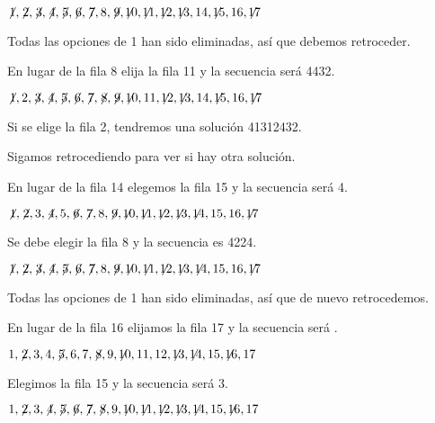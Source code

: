 $\not\! 1,\not\! 2,\not\! 3,\not\! 4,\not\! 5,\not\! 6,\not\! 7,8,\not\! 9,\not\!\! 10,\not\!\! 11,\not\!\! 12,\not\!\! 13,14, \not\!\! 15,16,\not\!\! 17$

\noindent Todas las opciones de 1 han sido eliminadas, así que debemos retroceder.

\smallskip

\noindent En lugar de la fila 8 elija la fila 11 y la secuencia será 44{}3{}2.


$\not\! 1,2,\not\! 3,\not\! 4,\not\! 5,\not\! 6,\not\! 7,\not\! 8,\not\! 9,\not\!\! 10,11,\not\!\! 12,\not\!\! 13,14, \not\!\! 15,16,\not\!\! 17$

\noindent  Si se elige la fila 2, tendremos una solución 4{}1{}3{}1{}2{}4{}3{}2.

\smallskip

\noindent Sigamos retrocediendo para ver si hay otra solución.

\smallskip

\noindent En lugar de la fila 14 elegemos la fila 15 y la secuencia será 4\textvisiblespace {}.

$\not\! 1,\not\! 2,3,\not\! 4,5,\not\! 6,\not\! 7,8,\not\! 9,\not\!\! 10,\not\!\! 11,\not\!\! 12,\not\!\! 13,\not\!\! 14,15,16,\not\!\! 17$

\noindent Se debe elegir la fila 8 y la secuencia es 4{}22{}4.

$\not\! 1,\not\! 2,\not\! 3,\not\! 4,\not\! 5,\not\! 6,\not\! 7,8,\not\! 9,\not\!\! 10,\not\!\! 11,\not\!\! 12,\not\!\! 13,\not\!\! 14,15,16,\not\!\! 17$

\noindent Todas las opciones de 1 han sido eliminadas, así que de nuevo retrocedemos.

\smallskip

\noindent En lugar de la fila 16 elijamos la fila 17 y la secuencia será \textvisiblespace \textvisiblespace \textvisiblespace{}\textvisiblespace.

$1,\not\! 2,3,4,\not\! 5,6,7,\not\! 8,9,\not\!\! 10,11,12,\not\!\! 13,\not\!\! 14,15,\not\!\! 16,17$

\noindent Elegimos la fila 15 y la secuencia será \textvisiblespace{}3.

$1,\not\! 2,3,\not\! 4,\not\! 5,\not\! 6,\not\! 7,\not\! 8,9,\not\!\! 10,\not\!\! 11,\not\!\! 12,\not\!\! 13,\not\!\! 14,15,\not\!\! 16,17$

